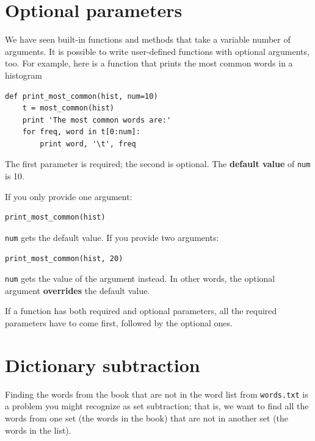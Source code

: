 \documentclass[10pt]{book}
\begin{document}
{\section{Optional parameters}


We have seen built-in functions and methods that take a variable
number of arguments.  It is possible to write user-defined functions
with optional arguments, too.  For example, here is a function that
prints the most common words in a histogram

\beforeverb
\begin{verbatim}
def print_most_common(hist, num=10)
    t = most_common(hist)
    print 'The most common words are:'
    for freq, word in t[0:num]:
        print word, '\t', freq
\end{verbatim}
\afterverb

The first parameter is required; the second is optional.
The {\bf default value} of {\tt num} is 10.


If you only provide one argument:

\beforeverb
\begin{verbatim}
print_most_common(hist)
\end{verbatim}
\afterverb

{\tt num} gets the default value.  If you provide two arguments:

\beforeverb
\begin{verbatim}
print_most_common(hist, 20)
\end{verbatim}
\afterverb

{\tt num} gets the value of the argument instead.  In other
words, the optional argument {\bf overrides} the default value.


If a function has both required and optional parameters, all
the required parameters have to come first, followed by the
optional ones.


\section{Dictionary subtraction}


Finding the words from the book that are not in the word list
from {\tt words.txt} is a problem you might recognize as set
subtraction; that is, we want to find all the words from one
set (the words in the book) that are not in another set (the
words in the list).

}
\end{document}
